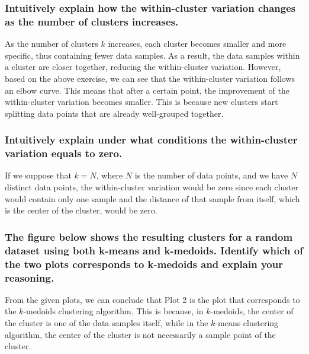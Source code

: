 \documentclass{article}
\begin{document}
\subsubsection{Intuitively explain how the within-cluster variation changes as the number of clusters increases.}  
As the number of clusters $k$ increases, each cluster becomes smaller and more specific, thus containing fewer data samples. As a result, the data samples within a cluster are closer together, reducing the within-cluster variation. However, based on the above exercise, we can see that the within-cluster variation follows an elbow curve. This means that after a certain point, the improvement of the within-cluster variation becomes smaller. This is because new clusters start splitting data points that are already well-grouped together.

\subsubsection{Intuitively explain under what conditions the within-cluster variation equals to zero.}
If we suppose that $k = N$, where $N$ is the number of data points, and we have $N$ distinct data points, the within-cluster variation would be zero since each cluster would contain only one sample and the distance of that sample from itself, which is the center of the cluster, would be zero.

\subsubsection{The figure below shows the resulting clusters for a random dataset using both k-means and k-medoids. Identify which of the two plots corresponds to k-medoids and explain your reasoning.}
From the given plots, we can conclude that Plot 2 is the plot that corresponds to the $k$-medoids clustering algorithm. This is because, in $k$-medoids, the center of the cluster is one of the data samples itself, while in the $k$-means clustering algorithm, the center of the cluster is not necessarily a sample point of the cluster.

\clearpage

% 
% 

\end{document}
